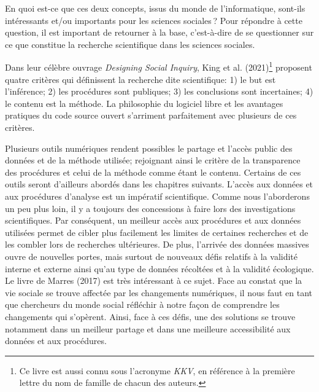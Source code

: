 \documentclass[
  letterpaper,
  DIV=11,
  numbers=noendperiod,
  oneside]{scrreprt}
\begin{document}
En quoi est-ce que ces deux concepts, issus du monde de l'informatique,
sont-ils intéressants et/ou importants pour les sciences sociales ? Pour
répondre à cette question, il est important de retourner à la base,
c'est-à-dire de se questionner sur ce que constitue la recherche
scientifique dans les sciences sociales.

Dans leur célèbre ouvrage \emph{Designing Social Inquiry}, King et al.
(2021)\footnote{Ce livre est aussi connu sous l'acronyme \emph{KKV}, en
  référence à la première lettre du nom de famille de chacun des
  auteurs.} proposent quatre critères qui définissent la recherche dite
scientifique: 1) le but est l'inférence; 2) les procédures sont
publiques; 3) les conclusions sont incertaines; 4) le contenu est la
méthode. La philosophie du logiciel libre et les avantages pratiques du
code source ouvert s'arriment parfaitement avec plusieurs de ces
critères.

Plusieurs outils numériques rendent possibles le partage et l'accès
public des données et de la méthode utilisée; rejoignant ainsi le
critère de la transparence des procédures et celui de la méthode comme
étant le contenu. Certains de ces outils seront d'ailleurs abordés dans
les chapitres suivants. L'accès aux données et aux procédures d'analyse
est un impératif scientifique. Comme nous l'aborderons un peu plus loin,
il y a toujours des concessions à faire lors des investigations
scientifiques. Par conséquent, un meilleur accès aux procédures et aux
données utilisées permet de cibler plus facilement les limites de
certaines recherches et de les combler lors de recherches ultérieures.
De plus, l'arrivée des données massives ouvre de nouvelles portes, mais
surtout de nouveaux défis relatifs à la validité interne et externe
ainsi qu'au type de données récoltées et à la validité écologique. Le
livre de Marres (2017) est très intéressant à ce sujet. Face au constat
que la vie sociale se trouve affectée par les changements numériques, il
nous faut en tant que chercheurs du monde social réfléchir à notre façon
de comprendre les changements qui s'opèrent. Ainsi, face à ces défis,
une des solutions se trouve notamment dans un meilleur partage et dans
une meilleure accessibilité aux données et aux procédures.
\end{document}

